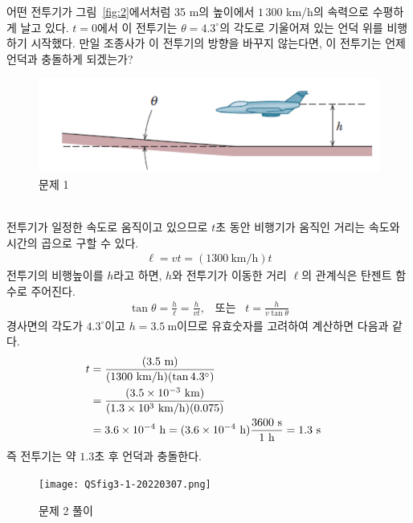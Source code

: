 \documentclass[APS,floatfix,nofootinbib,superscriptaddress,fleqn,preprint]{revtex4}
\begin{document}
어떤 전투기가 그림~\ref{fig:2}에서처럼
35 m의 높이에서 $1\,300$ km/h의 속력으로 수평하게 날고 있다. $t=0$에서
이 전투기는 $\theta=4.3^\circ$의 각도로 기울어져 있는 언덕 위를
비행하기 시작했다. 만일 조종사가 이 전투기의 방향을 바꾸지 않는다면,
이 전투기는 언제 언덕과 충돌하게 되겠는가? 
\begin{figure}[ht]
  \centering
\includegraphics[scale=1.0]{Qfig3-2.pdf}  
  \caption{문제 1}
  \label{fig:1}
\end{figure} \\
전투기가 일정한 속도로 움직이고 있으므로 $t$초 동안 비행기가 움직인 거리는 속도와 시간의
곱으로 구할 수 있다.
\begin{align} \label{}
\ell = vt = (1300~\mathrm{km/h})t
\end{align}
전투기의 비행높이를 $h$라고 하면, $h$와 전투기가 이동한 거리 $\ell$의 관계식은 탄젠트 함수로 주어진다.
\begin{align} \label{}
\tan{\theta} = \frac{h}{\ell} = \frac{h}{vt}, \;\;\; \text{또는} \;\;\; t = 
\frac{h}{v\tan{\theta}}
\end{align}
경사면의 각도가 $4.3^\circ$이고 $h=3.5~\mathrm{m}$이므로 유효숫자를 고려하여 계산하면 다음과 같다.
\begin{align} \label{}
t &= \frac{(3.5~\mathrm{m})}{(1300~\mathrm{km/h})(\tan{4.3^\circ})} \cr
&= \frac{(3.5\times 10^{-3}~\mathrm{km})}{(1.3\times 10^3~\mathrm{km/h})(0.075)}
\cr
&= 3.6\times 10^{-4}~\mathrm{h} = (3.6\times 10^{-4}~\mathrm{h})
\frac{3600~\mathrm{s}}{1~\mathrm{h}} = 1.3~\mathrm{s}
\end{align}
즉 전투기는 약 $1.3$초 후 언덕과 충돌한다.
\begin{figure}[htp]
\centering
\texttt{[image: QSfig3-1-20220307.png]}
\caption{문제 2 풀이}
\end{figure}
\vspace{0.5cm}
\end{document}
